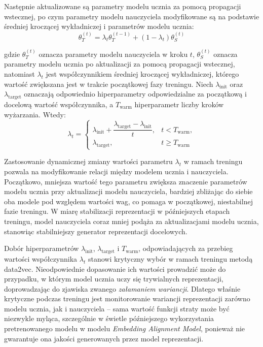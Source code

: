 Następnie aktualizowane są parametry modelu ucznia za pomocą propagacji wstecznej, po czym parametry modelu nauczyciela modyfikowane są na podstawie średniej kroczącej wykładniczej i parametrów modelu ucznia:
\begin{equation}
    \theta_{T}^{(t)} = \lambda_t \theta_{T}^{(t-1)} + (1-\lambda_t)\theta_{S}^{(t)}
\end{equation}

gdzie $\theta_{T}^{(t)}$ oznacza parametry modelu nauczyciela w kroku $t$, $\theta_{S}^{(t)}$ oznacza parametry modelu ucznia po aktualizacji za pomocą propagacji wstecznej, natomiast $\lambda_t$ jest współczynnikiem średniej kroczącej wykładniczej, którego wartość zwiększana jest w trakcie początkowej fazy treningu. Niech $\lambda_{\mathrm{init}}$ oraz $\lambda_{\mathrm{target}}$ oznaczają odpowiednio hiperparametry odpowiedzialne za początkową i docelową wartość współczynnika, a $T_{\mathrm{warm}}$ hiperparametr liczby kroków wyżarzania. Wtedy:
\begin{equation}
\lambda_t =
\begin{cases}
\lambda_{\mathrm{init}}
+
\dfrac{\lambda_{\mathrm{target}}-\lambda_{\mathrm{init}}}{t},
& t < T_{\mathrm{warm}}, \\
\lambda_{\mathrm{target}},
& t \geq T_{\mathrm{warm}}
\end{cases}
\end{equation}

Zastosowanie dynamicznej zmiany wartości parametru $\lambda_t$ w ramach treningu pozwala na modyfikowanie relacji między modelem ucznia i nauczyciela. Początkowo, mniejsza wartość tego parametru zwiększa znaczenie parametrów modelu ucznia przy aktualizacji modelu nauczyciela, bardziej zbliżając do siebie oba modele pod względem wartości wag, co pomaga w początkowej, niestabilnej fazie treningu. W miarę stabilizacji reprezentacji w późniejszych etapach treningu, model nauczyciela coraz mniej podąża za aktualizacjami modelu ucznia, stanowiąc stabilniejszy generator reprezentacji docelowych.

Dobór hiperparametrów $\lambda_{\mathrm{init}}$, $\lambda_{\mathrm{target}}$ i $T_{\mathrm{warm}}$, odpowiadających za przebieg wartości współczynnika $\lambda_t$ stanowi krytyczny wybór w ramach treningu metodą data2vec. Nieodpowiednie dopasowanie ich wartości prowadzić może do przypadku, w którym model ucznia uczy się trywialnych reprezentacji, doprowadzając do zjawiska zwanego \textit{załamaniem wariancji}. Dlatego właśnie krytyczne podczas treningu jest monitorowanie wariancji reprezentacji zarówno modelu ucznia, jak i nauczyciela -- sama wartość funkcji straty może być niezwykle myląca, szczególnie w świetle późniejszego wykorzystania pretrenowanego modelu w modelu \textit{Embedding Alignment Model}, ponieważ nie gwarantuje ona jakości generowanych przez model reprezentacji.

